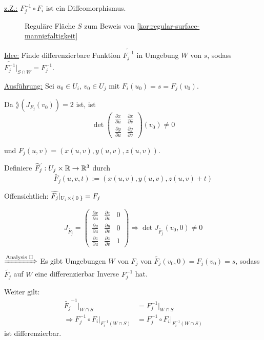 \begin{beweis}\leavevmode


    \underline{z.Z.:} $F_j^{-1} \circ F_i$ ist ein Diffeomorphismus.

    \begin{figure}[htp]
        \centering
        
        \caption{Reguläre Fläche $S$ zum Beweis von \cref{kor:regular-surface-mannigfaltigkeit}}
        \label{fig:parametric-surface-mapping}
    \end{figure}
    

    \underline{Idee:} Finde differenzierbare Funktion $\widetilde{F_j^{-1}}$
    in Umgebung $W$ von $s$, sodass $\widetilde{F_j^{-1}}|_{S \cap W} = F_j^{-1}$.

    \underline{Ausführung:} Sei $u_0 \in U_i$, $v_0 \in U_j$ mit $F_i(u_0) = s = F_j(v_0)$.

    Da $\rang(J_{F_j}(v_0)) = 2$ ist, ist \obda 
    \[\det 
        \begin{pmatrix}
            \frac{\partial x}{\partial u} & \frac{\partial x}{\partial v}\\
            \frac{\partial y}{\partial u} & \frac{\partial y}{\partial v}
        \end{pmatrix} (v_0) \neq 0
    \]

    und $F_j(u,v) = \left ( x(u,v), y(u,v), z(u,v) \right)$.

    Definiere $\widetilde{F_j}: U_j \times \mathbb{R} \rightarrow \mathbb{R}^3$ durch
    \[\widetilde{F_j} (u, v, t) := \left(x(u,v), y(u,v), z(u,v)+t \right )\]
    
    Offensichtlich: $\widetilde{F_j} |_{U_j \times \Set{0}} = F_j$

    \[J_{\widetilde{F_j}} = 
    \begin{pmatrix}
        \frac{\partial x}{\partial u}   & \frac{\partial x}{\partial v} & 0\\
        \frac{\partial y}{\partial u}   & \frac{\partial y}{\partial v} & 0\\
        \frac{\partial z}{\partial u}   & \frac{\partial z}{\partial v} & 1
    \end{pmatrix} \Rightarrow \det J_{\widetilde{F_j}} (v_0, 0) \neq  0\]

    $\xRightarrow{\text{Analysis II}}$ Es gibt Umgebungen $W$ von
    $F_j$ von $\widetilde{F_j}(v_0, 0) = F_j(v_0) = s$, sodass $\widetilde{F_j}$
    auf $W$ eine differenzierbar Inverse $F_j^{-1}$ hat.

    Weiter gilt:
    \begin{align*}
        \widetilde{F_j}^{-1}|_{W \cap S} &= F_j^{-1} |_{W \cap S}\\
        \Rightarrow F_j^{-1} \circ F_i |_{F_i^{-1} (W \cap S)} &= F_j^{-1} \circ F_i |_{F_i^{-1} (W \cap S)}
    \end{align*}
    ist differenzierbar.
\end{beweis}


